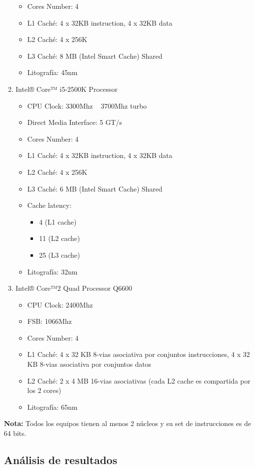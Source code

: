 \begin{enumerate}
\begin{itemize}
				\item Cores Number: 4
				\item L1 Caché: 4 x 32KB instruction, 4 x 32KB data
				\item L2 Caché: 4 x 256K
				\item L3 Caché: 8 MB (Intel Smart Cache) Shared
				\item Litografía: 45nm
			\end{itemize}
	\item Intel® Core™ i5-2500K Processor
			\begin{itemize}
				\item CPU Clock: 3300Mhz ~ 3700Mhz turbo
				\item Direct Media Interface: 5 GT/s
				\item Cores Number: 4
				\item L1 Caché: 4 x 32KB instruction, 4 x 32KB data
				\item L2 Caché: 4 x 256K
				\item L3 Caché: 6 MB (Intel Smart Cache) Shared
				\item Cache latency:
					\begin{itemize}	
						\item 4 (L1 cache)
						\item 11 (L2 cache)
						\item 25 (L3 cache)
					\end{itemize}
				\item Litografía: 32nm
			\end{itemize}
		\item Intel® Core™2 Quad Processor Q6600
			\begin{itemize}
				\item CPU Clock: 2400Mhz
				\item FSB: 1066Mhz
				\item Cores Number: 4
				\item L1 Caché: 4 x 32 KB 8-vias asociativa por conjuntos instrucciones, 4 x 32 KB 8-vias asociativa por conjuntos datos
				\item L2 Caché: 2 x 4 MB 16-vias asociativas (cada L2 cache es compartida por los 2 cores)				
				\item Litografía: 65nm
			\end{itemize}
\end{enumerate}
\textbf{Nota:} Todos los equipos tienen al menos 2 núcleos y su set de instrucciones es de 64 bits.
\subsection{Análisis de resultados}

